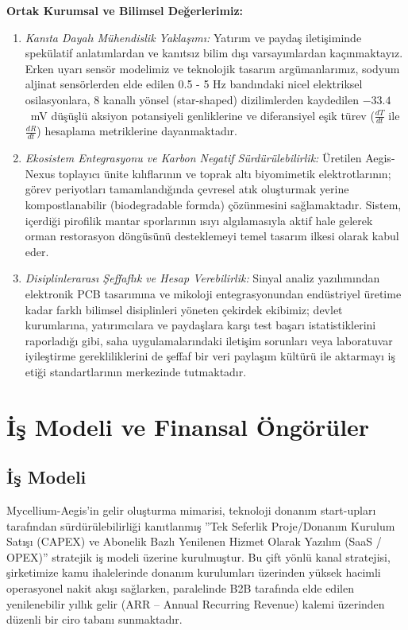 \documentclass[11pt,a4paper]{article}
\begin{document}
\textbf{Ortak Kurumsal ve Bilimsel Değerlerimiz:}
\begin{enumerate}[leftmargin=1.2cm]
  \item \textit{Kanıta Dayalı Mühendislik Yaklaşımı:} Yatırım ve paydaş iletişiminde spekülatif anlatımlardan ve kanıtsız bilim dışı varsayımlardan kaçınmaktayız. Erken uyarı sensör modelimiz ve teknolojik tasarım argümanlarımız, sodyum aljinat sensörlerden elde edilen 0.5 - 5 Hz bandındaki nicel elektriksel osilasyonlara, 8 kanallı yönsel (star-shaped) dizilimlerden kaydedilen $-33.4$~mV düşüşlü aksiyon potansiyeli genliklerine ve diferansiyel eşik türev ($\frac{dT}{dt}$ ile $\frac{dR}{dt}$) hesaplama metriklerine dayanmaktadır.
  \item \textit{Ekosistem Entegrasyonu ve Karbon Negatif Sürdürülebilirlik:} Üretilen Aegis-Nexus toplayıcı ünite kılıflarının ve toprak altı biyomimetik elektrotlarının; görev periyotları tamamlandığında çevresel atık oluşturmak yerine kompostlanabilir (biodegradable formda) çözünmesini sağlamaktadır. Sistem, içerdiği pirofilik mantar sporlarının ısıyı algılamasıyla aktif hale gelerek orman restorasyon döngüsünü desteklemeyi temel tasarım ilkesi olarak kabul eder.
  \item \textit{Disiplinlerarası Şeffaflık ve Hesap Verebilirlik:} Sinyal analiz yazılımından elektronik PCB tasarımına ve mikoloji entegrasyonundan endüstriyel üretime kadar farklı bilimsel disiplinleri yöneten çekirdek ekibimiz; devlet kurumlarına, yatırımcılara ve paydaşlara karşı test başarı istatistiklerini raporladığı gibi, saha uygulamalarındaki iletişim sorunları veya laboratuvar iyileştirme gerekliliklerini de şeffaf bir veri paylaşım kültürü ile aktarmayı iş etiği standartlarının merkezinde tutmaktadır.
\end{enumerate}

\section{İş Modeli ve Finansal Öngörüler}

\subsection{İş Modeli}

Mycellium-Aegis'in gelir oluşturma mimarisi, teknoloji donanım start-upları tarafından sürdürülebilirliği kanıtlanmış ''Tek Seferlik Proje/Donanım Kurulum Satışı (CAPEX) ve Abonelik Bazlı Yenilenen Hizmet Olarak Yazılım (SaaS / OPEX)'' stratejik iş modeli üzerine kurulmuştur. Bu çift yönlü kanal stratejisi, şirketimize kamu ihalelerinde donanım kurulumları üzerinden yüksek hacimli operasyonel nakit akışı sağlarken, paralelinde B2B tarafında elde edilen yenilenebilir yıllık gelir (ARR -- Annual Recurring Revenue) kalemi üzerinden düzenli bir ciro tabanı sunmaktadır.
\end{document}

